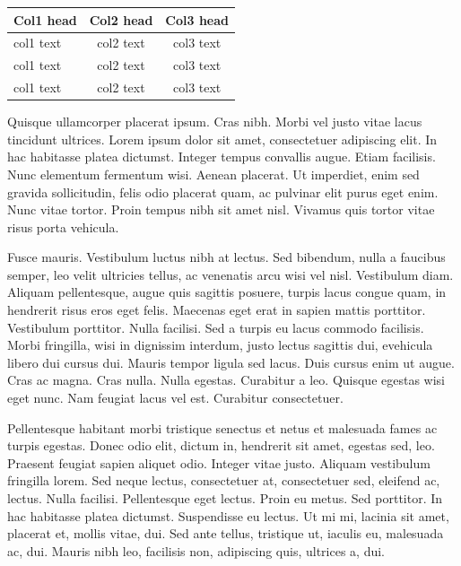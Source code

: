\documentclass[AMA,Times1COL]{WileyNJDv5} %
\begin{document}
\begin{center}
\begin{tabular*}{250pt}{@{\extracolsep\fill}lcc@{\extracolsep\fill}}%
\toprule
\textbf{Col1 head} & \textbf{Col2 head} & \textbf{Col3 head} \\
\midrule
col1 text & col2 text & col3 text \\
col1 text & col2 text & col3 text \\
col1 text & col2 text & col3 text \\
\bottomrule
\end{tabular*}
\end{center}


Quisque ullamcorper placerat ipsum. Cras nibh. Morbi vel justo vitae lacus tincidunt ultrices. Lorem ipsum dolor sit
amet, consectetuer adipiscing elit. In hac habitasse platea dictumst. Integer tempus convallis augue. Etiam facilisis.
Nunc elementum fermentum wisi. Aenean placerat. Ut imperdiet, enim sed gravida sollicitudin, felis odio placerat
quam, ac pulvinar elit purus eget enim. Nunc vitae tortor. Proin tempus nibh sit amet nisl. Vivamus quis tortor
vitae risus porta vehicula.

Fusce mauris. Vestibulum luctus nibh at lectus. Sed bibendum, nulla a faucibus semper, leo velit ultricies tellus, ac
venenatis arcu wisi vel nisl. Vestibulum diam. Aliquam pellentesque, augue quis sagittis posuere, turpis lacus congue
quam, in hendrerit risus eros eget felis. Maecenas eget erat in sapien mattis porttitor. Vestibulum porttitor. Nulla
facilisi. Sed a turpis eu lacus commodo facilisis. Morbi fringilla, wisi in dignissim interdum, justo lectus sagittis dui, evehicula libero dui cursus dui. Mauris tempor ligula sed lacus. Duis cursus enim ut augue. Cras ac magna. Cras nulla.
Nulla egestas. Curabitur a leo. Quisque egestas wisi eget nunc. Nam feugiat lacus vel est. Curabitur consectetuer.

Pellentesque habitant morbi tristique senectus et netus et malesuada fames ac turpis egestas. Donec odio elit,
dictum in, hendrerit sit amet, egestas sed, leo. Praesent feugiat sapien aliquet odio. Integer vitae justo. Aliquam
vestibulum fringilla lorem. Sed neque lectus, consectetuer at, consectetuer sed, eleifend ac, lectus. Nulla facilisi.
Pellentesque eget lectus. Proin eu metus. Sed porttitor. In hac habitasse platea dictumst. Suspendisse eu lectus. Ut
mi mi, lacinia sit amet, placerat et, mollis vitae, dui. Sed ante tellus, tristique ut, iaculis eu, malesuada ac, dui.
Mauris nibh leo, facilisis non, adipiscing quis, ultrices a, dui.
\end{document}
